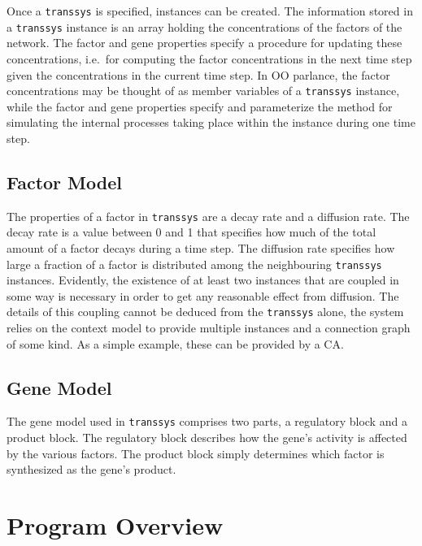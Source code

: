 \documentclass[12pt]{article}
\newcommand{\transsys}{\texttt{transsys}}
\begin{document}
Once a \transsys{} is specified, instances can be created. The
information stored in a \transsys{} instance is an array holding the
concentrations of the factors of the network. The factor and gene
properties specify a procedure for updating these concentrations,
i.e.\ for computing the factor concentrations in the next time step
given the concentrations in the current time step. In OO parlance, the
factor concentrations may be thought of as member variables of a
\transsys{} instance, while the factor and gene properties specify and
parameterize the method for simulating the internal processes taking
place within the instance during one time step.


\subsection{Factor Model}

The properties of a factor in \transsys{} are a decay rate and a
diffusion rate. The decay rate is a value between 0 and 1 that
specifies how much of the total amount of a factor decays during a
time step. The diffusion rate specifies how large a fraction of a
factor is distributed among the neighbouring \transsys{} instances.
Evidently, the existence of at least two instances that are coupled in
some way is necessary in order to get any reasonable effect from
diffusion. The details of this coupling cannot be deduced from the
\transsys{} alone, the system relies on the context model to provide
multiple instances and a connection graph of some kind. As a simple
example, these can be provided by a CA.


\subsection{Gene Model}

The gene model used in \transsys{} comprises two parts, a regulatory
block and a product block. The regulatory block describes how the
gene's activity is affected by the various factors. The product block
simply determines which factor is synthesized as the gene's product.


\section{Program Overview}
\end{document}
